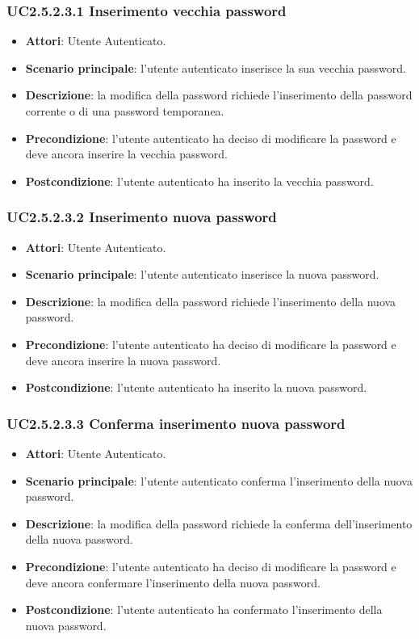 \subsubsection{UC2.5.2.3.1 Inserimento vecchia password}
\begin{itemize}
\item \textbf{Attori}: Utente Autenticato.
\item \textbf{Scenario principale}: l'utente autenticato inserisce la sua vecchia password.
\item \textbf{Descrizione}: la modifica della password richiede l'inserimento della password corrente o di una password temporanea.
\item \textbf{Precondizione}: l'utente autenticato ha deciso di modificare la password e deve ancora inserire la vecchia password.
\item \textbf{Postcondizione}: l'utente autenticato ha inserito la vecchia password.
\end{itemize}
\subsubsection{UC2.5.2.3.2 Inserimento nuova password}
\begin{itemize}
\item \textbf{Attori}: Utente Autenticato.
\item \textbf{Scenario principale}: l'utente autenticato inserisce la nuova password.
\item \textbf{Descrizione}: la modifica della password richiede l'inserimento della nuova password.
\item \textbf{Precondizione}: l'utente autenticato ha deciso di modificare la password e deve ancora inserire la nuova password.
\item \textbf{Postcondizione}: l'utente autenticato ha inserito la nuova password.
\end{itemize}
\subsubsection{UC2.5.2.3.3 Conferma inserimento nuova password}
\begin{itemize}
\item \textbf{Attori}: Utente Autenticato.
\item \textbf{Scenario principale}: l'utente autenticato conferma l'inserimento della nuova password.
\item \textbf{Descrizione}: la modifica della password richiede la conferma dell'inserimento della nuova password.
\item \textbf{Precondizione}: l'utente autenticato ha deciso di modificare la password e deve ancora confermare l'inserimento della nuova password.
\item \textbf{Postcondizione}: l'utente autenticato ha confermato l'inserimento della nuova password.
\end{itemize}
